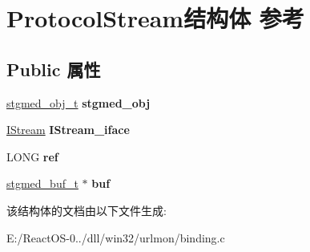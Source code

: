 \hypertarget{struct_protocol_stream}{}\section{Protocol\+Stream结构体 参考}
\label{struct_protocol_stream}
\subsection*{Public 属性}
\begin{DoxyCompactItemize}
\item 
\mbox{\label{struct_protocol_stream_af0063d9c02a45619b293aed249e6fe93}} 
\hyperlink{struct__stgmed__obj__t}{stgmed\+\_\+obj\+\_\+t} {\bfseries stgmed\+\_\+obj}
\item 
\mbox{\label{struct_protocol_stream_af4153fbaab68076af16ae18ef10a240d}} 
\hyperlink{interface_i_stream}{I\+Stream} {\bfseries I\+Stream\+\_\+iface}
\item 
\mbox{\label{struct_protocol_stream_ab251356657b616e7f22ff508404fecc5}} 
L\+O\+NG {\bfseries ref}
\item 
\mbox{\label{struct_protocol_stream_ae918cc080959a282c3eb61ba9d8f88ac}} 
\hyperlink{structstgmed__buf__t}{stgmed\+\_\+buf\+\_\+t} $\ast$ {\bfseries buf}
\end{DoxyCompactItemize}


该结构体的文档由以下文件生成\+:\begin{DoxyCompactItemize}
\item 
E\+:/\+React\+O\+S-\/0../dll/win32/urlmon/binding.\+c\end{DoxyCompactItemize}
